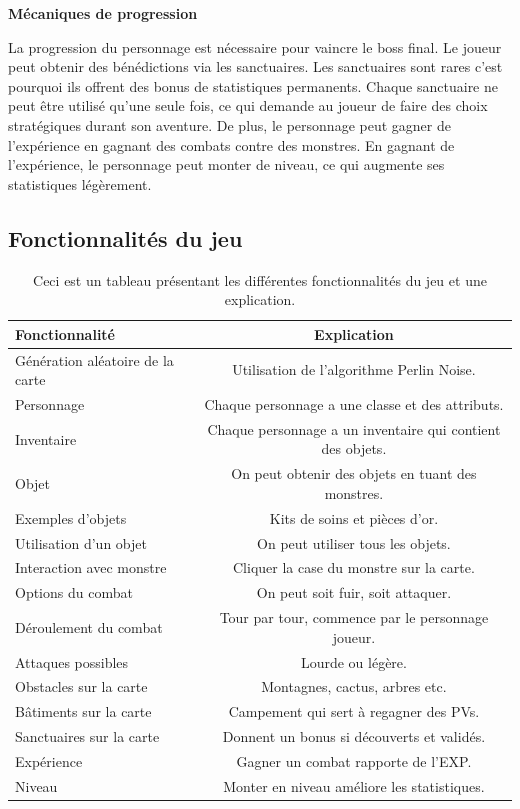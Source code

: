 \documentclass[11pt,a4paper]{article}
\begin{document}
\medskip

\textbf{Mécaniques de progression} 

\noindent La progression du personnage est nécessaire pour vaincre le boss final. 
Le joueur peut obtenir des bénédictions via les sanctuaires. 
Les sanctuaires sont rares c'est pourquoi ils offrent des bonus de statistiques permanents. 
Chaque sanctuaire ne peut être utilisé qu'une seule fois, ce qui demande au joueur de faire des choix stratégiques durant son aventure.
De plus, le personnage peut gagner de l'expérience en gagnant des combats contre des monstres. En gagnant de l'expérience, 
le personnage peut monter de niveau, ce qui augmente ses statistiques légèrement.

\medskip

\subsection{Fonctionnalités du jeu}

\begin{table}[H]
\begin{tabular}{|l|c|}
\hline
Fonctionnalité & Explication \\
\hline
Génération aléatoire de la carte & Utilisation de l'algorithme Perlin Noise. \\
Personnage & Chaque personnage a une classe et des attributs. \\
Inventaire & Chaque personnage a un inventaire qui contient des objets. \\
Objet & On peut obtenir des objets en tuant des monstres. \\
Exemples d'objets & Kits de soins et pièces d'or. \\
Utilisation d'un objet & On peut utiliser tous les objets. \\
Interaction avec monstre & Cliquer la case du monstre sur la carte. \\
Options du combat & On peut soit fuir, soit attaquer. \\
Déroulement du combat & Tour par tour, commence par le personnage joueur. \\
Attaques possibles & Lourde ou légère. \\
Obstacles sur la carte & Montagnes, cactus, arbres etc. \\
Bâtiments sur la carte & Campement qui sert à regagner des PVs. \\
Sanctuaires sur la carte & Donnent un bonus si découverts et validés. \\
Expérience & Gagner un combat rapporte de l'EXP. \\
Niveau & Monter en niveau améliore les statistiques. \\

\hline
\end{tabular}
\label{tab_taches}
\caption{Ceci est un tableau présentant les différentes fonctionnalités du jeu et une explication.}
\end{table}
\end{document}

